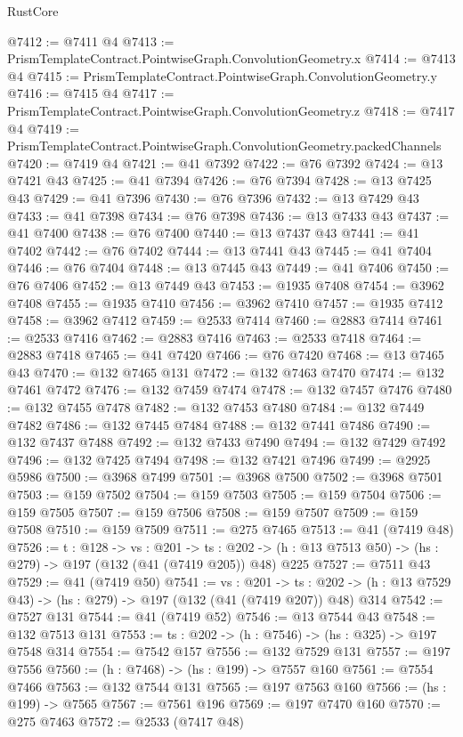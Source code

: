 \begin{lexlean}{RustCore}
\begin{coremodule}
@7412 := @7411 @4
@7413 := PrismTemplateContract.PointwiseGraph.ConvolutionGeometry.x
@7414 := @7413 @4
@7415 := PrismTemplateContract.PointwiseGraph.ConvolutionGeometry.y
@7416 := @7415 @4
@7417 := PrismTemplateContract.PointwiseGraph.ConvolutionGeometry.z
@7418 := @7417 @4
@7419 := PrismTemplateContract.PointwiseGraph.ConvolutionGeometry.packedChannels
@7420 := @7419 @4
@7421 := @41 @7392
@7422 := @76 @7392
@7424 := @13 @7421 @43
@7425 := @41 @7394
@7426 := @76 @7394
@7428 := @13 @7425 @43
@7429 := @41 @7396
@7430 := @76 @7396
@7432 := @13 @7429 @43
@7433 := @41 @7398
@7434 := @76 @7398
@7436 := @13 @7433 @43
@7437 := @41 @7400
@7438 := @76 @7400
@7440 := @13 @7437 @43
@7441 := @41 @7402
@7442 := @76 @7402
@7444 := @13 @7441 @43
@7445 := @41 @7404
@7446 := @76 @7404
@7448 := @13 @7445 @43
@7449 := @41 @7406
@7450 := @76 @7406
@7452 := @13 @7449 @43
@7453 := @1935 @7408
@7454 := @3962 @7408
@7455 := @1935 @7410
@7456 := @3962 @7410
@7457 := @1935 @7412
@7458 := @3962 @7412
@7459 := @2533 @7414
@7460 := @2883 @7414
@7461 := @2533 @7416
@7462 := @2883 @7416
@7463 := @2533 @7418
@7464 := @2883 @7418
@7465 := @41 @7420
@7466 := @76 @7420
@7468 := @13 @7465 @43
@7470 := @132 @7465 @131
@7472 := @132 @7463 @7470
@7474 := @132 @7461 @7472
@7476 := @132 @7459 @7474
@7478 := @132 @7457 @7476
@7480 := @132 @7455 @7478
@7482 := @132 @7453 @7480
@7484 := @132 @7449 @7482
@7486 := @132 @7445 @7484
@7488 := @132 @7441 @7486
@7490 := @132 @7437 @7488
@7492 := @132 @7433 @7490
@7494 := @132 @7429 @7492
@7496 := @132 @7425 @7494
@7498 := @132 @7421 @7496
@7499 := @2925 @5986
@7500 := @3968 @7499
@7501 := @3968 @7500
@7502 := @3968 @7501
@7503 := @159 @7502
@7504 := @159 @7503
@7505 := @159 @7504
@7506 := @159 @7505
@7507 := @159 @7506
@7508 := @159 @7507
@7509 := @159 @7508
@7510 := @159 @7509
@7511 := @275 @7465
@7513 := @41 (@7419 @48)
@7526 := {t : @128} ->
  {vs : @201} ->
  {ts : @202} -> (h : @13 @7513 @50) -> (hs : @279) -> @197 (@132 (@41 (@7419 @205)) @48) @225
@7527 := @7511 @43
@7529 := @41 (@7419 @50)
@7541 := {vs : @201} ->
  {ts : @202} -> (h : @13 @7529 @43) -> (hs : @279) -> @197 (@132 (@41 (@7419 @207)) @48) @314
@7542 := @7527 @131
@7544 := @41 (@7419 @52)
@7546 := @13 @7544 @43
@7548 := @132 @7513 @131
@7553 := {ts : @202} -> (h : @7546) -> (hs : @325) -> @197 @7548 @314
@7554 := @7542 @157
@7556 := @132 @7529 @131
@7557 := @197 @7556
@7560 := (h : @7468) -> (hs : @199) -> @7557 @160
@7561 := @7554 @7466
@7563 := @132 @7544 @131
@7565 := @197 @7563 @160
@7566 := (hs : @199) -> @7565
@7567 := @7561 @196
@7569 := @197 @7470 @160
@7570 := @275 @7463
@7572 := @2533 (@7417 @48)

\end{coremodule}
\end{lexlean}

